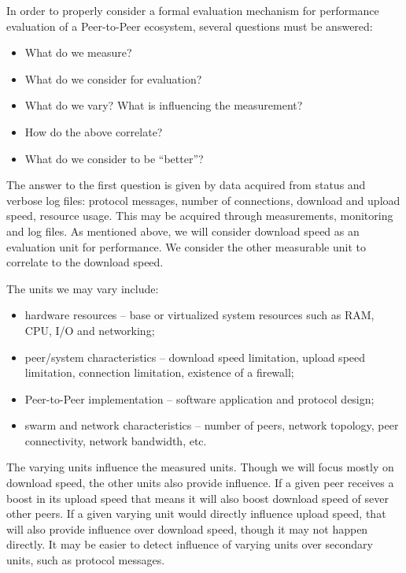 In order to properly consider a formal evaluation mechanism for performance
evaluation of a Peer-to-Peer ecosystem, several questions must be answered:

\begin{itemize}
  \item What do we measure?
  \item What do we consider for evaluation?
  \item What do we vary? What is influencing the measurement?
  \item How do the above correlate?
  \item What do we consider to be ``better''?
\end{itemize}

The answer to the first question is given by data acquired from status and
verbose log files: protocol messages, number of connections, download and
upload speed, resource usage. This may be acquired through measurements,
monitoring and log files. As mentioned above, we will consider download speed
as an evaluation unit for performance. We consider the other measurable unit
to correlate to the download speed.

The units we may vary include:

\begin{itemize}
  \item hardware resources -- base or virtualized system resources such as
  RAM, CPU, I/O and networking;
  \item peer/system characteristics -- download speed limitation, upload speed
  limitation, connection limitation, existence of a firewall;
  \item Peer-to-Peer implementation -- software application and protocol
  design;
  \item swarm and network characteristics -- number of peers, network
  topology, peer connectivity, network bandwidth, etc.
\end{itemize}

The varying units influence the measured units. Though we will focus mostly on
download speed, the other units also provide influence. If a given peer
receives a boost in its upload speed that means it will also boost download
speed of sever other peers. If a given varying unit would directly influence
upload speed, that will also provide influence over download speed, though it
may not happen directly. It may be easier to detect influence of varying units
over secondary units, such as protocol messages.

